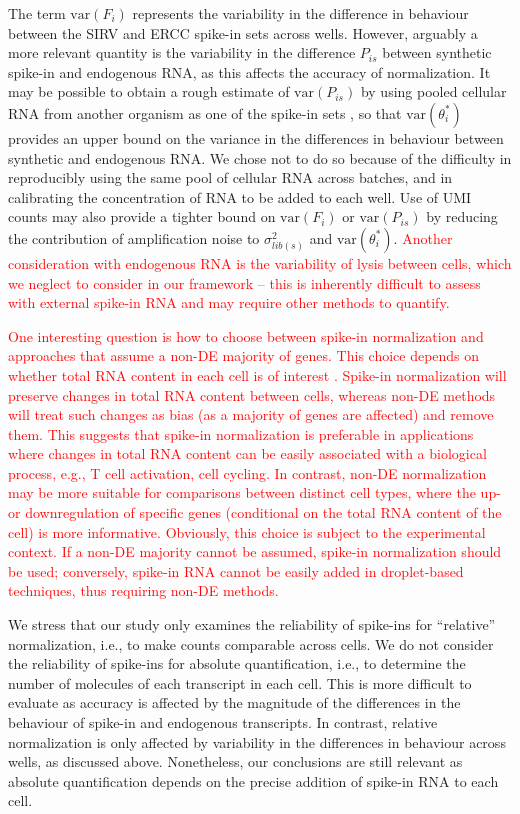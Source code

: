 \documentclass{article}
\newcommand{\revised}[1]{\textcolor{red}{#1}}
\newcommand\variance{\mbox{var}}
\begin{document}
The term $\variance(F_i)$ represents the variability in the difference in behaviour between the SIRV and ERCC spike-in sets across wells.
However, arguably a more relevant quantity is the variability in the difference $P_{is}$ between synthetic spike-in and endogenous RNA, as this affects the accuracy of normalization.
It may be possible to obtain a rough estimate of $\variance(P_{is})$ by using pooled cellular RNA from another organism as one of the spike-in sets \autocite{brennecke2013accounting}, so that $\variance(\theta^*_i)$ provides an upper bound on the variance in the differences in behaviour between synthetic and endogenous RNA.
We chose not to do so because of the difficulty in reproducibly using the same pool of cellular RNA across batches, and in calibrating the concentration of RNA to be added to each well.
Use of UMI counts may also provide a tighter bound on $\variance(F_i)$ or $\variance(P_{is})$ by reducing the contribution of amplification noise to $\sigma^2_{lib(s)}$ and $\variance(\theta^*_i)$.
\revised{Another consideration with endogenous RNA is the variability of lysis between cells, which we neglect to consider in our framework -- this is inherently difficult to assess with external spike-in RNA and may require other methods to quantify.}

\revised{One interesting question is how to choose between spike-in normalization and approaches that assume a non-DE majority of genes.
This choice depends on whether total RNA content in each cell is of interest \autocite{lun2016stepbystep}.
Spike-in normalization will preserve changes in total RNA content between cells, whereas non-DE methods will treat such changes as bias (as a majority of genes are affected) and remove them.
This suggests that spike-in normalization is preferable in applications where changes in total RNA content can be easily associated with a biological process, e.g., T cell activation,   cell cycling.
In contrast, non-DE normalization may be more suitable for comparisons between distinct cell types, where the up- or downregulation of specific genes (conditional on the total RNA content of the cell) is more informative.
Obviously, this choice is subject to the experimental context.
If a non-DE majority cannot be assumed, spike-in normalization should be used; conversely, spike-in RNA cannot be easily added in droplet-based techniques, thus requiring non-DE methods.}

We stress that our study only examines the reliability of spike-ins for ``relative'' normalization, i.e., to make counts comparable across cells.
We do not consider the reliability of spike-ins for absolute quantification, i.e., to determine the number of molecules of each transcript in each cell.
This is more difficult to evaluate as accuracy is affected by the magnitude of the differences in the behaviour of spike-in and endogenous transcripts.
In contrast, relative normalization is only affected by variability in the differences in behaviour across wells, as discussed above.
Nonetheless, our conclusions are still relevant as absolute quantification depends on the precise addition of spike-in RNA to each cell.
\end{document}
